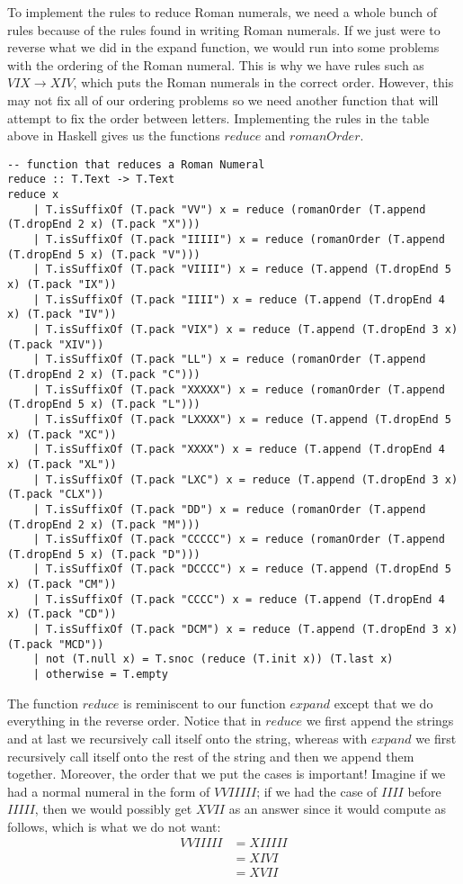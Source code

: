 \documentclass{article}
\begin{document}
To implement the rules to reduce Roman numerals, we need a whole bunch of rules because of the rules found in writing Roman numerals. If we just were to reverse what we did in the expand function, we would run into some problems with the ordering of the Roman numeral. This is why we have rules such as $VIX \rightarrow XIV$, which puts the Roman numerals in the correct order. However, this may not fix all of our ordering problems so we need another function that will attempt to fix the order between letters. Implementing the rules in the table above in Haskell gives us the functions $reduce$ and $romanOrder$. 

\begin{lstlisting}
-- function that reduces a Roman Numeral
reduce :: T.Text -> T.Text
reduce x
    | T.isSuffixOf (T.pack "VV") x = reduce (romanOrder (T.append (T.dropEnd 2 x) (T.pack "X")))
    | T.isSuffixOf (T.pack "IIIII") x = reduce (romanOrder (T.append (T.dropEnd 5 x) (T.pack "V")))
    | T.isSuffixOf (T.pack "VIIII") x = reduce (T.append (T.dropEnd 5 x) (T.pack "IX"))
    | T.isSuffixOf (T.pack "IIII") x = reduce (T.append (T.dropEnd 4 x) (T.pack "IV"))
    | T.isSuffixOf (T.pack "VIX") x = reduce (T.append (T.dropEnd 3 x) (T.pack "XIV"))
    | T.isSuffixOf (T.pack "LL") x = reduce (romanOrder (T.append (T.dropEnd 2 x) (T.pack "C")))
    | T.isSuffixOf (T.pack "XXXXX") x = reduce (romanOrder (T.append (T.dropEnd 5 x) (T.pack "L")))
    | T.isSuffixOf (T.pack "LXXXX") x = reduce (T.append (T.dropEnd 5 x) (T.pack "XC"))
    | T.isSuffixOf (T.pack "XXXX") x = reduce (T.append (T.dropEnd 4 x) (T.pack "XL"))
    | T.isSuffixOf (T.pack "LXC") x = reduce (T.append (T.dropEnd 3 x) (T.pack "CLX"))
    | T.isSuffixOf (T.pack "DD") x = reduce (romanOrder (T.append (T.dropEnd 2 x) (T.pack "M")))
    | T.isSuffixOf (T.pack "CCCCC") x = reduce (romanOrder (T.append (T.dropEnd 5 x) (T.pack "D")))
    | T.isSuffixOf (T.pack "DCCCC") x = reduce (T.append (T.dropEnd 5 x) (T.pack "CM"))
    | T.isSuffixOf (T.pack "CCCC") x = reduce (T.append (T.dropEnd 4 x) (T.pack "CD"))
    | T.isSuffixOf (T.pack "DCM") x = reduce (T.append (T.dropEnd 3 x) (T.pack "MCD"))
    | not (T.null x) = T.snoc (reduce (T.init x)) (T.last x)
    | otherwise = T.empty
\end{lstlisting}

The function $reduce$ is reminiscent to our function $expand$ except that we do everything in the reverse order. Notice that in $reduce$ we first append the strings and at last we recursively call itself onto the string, whereas with $expand$ we first recursively call itself onto the rest of the string and then we append them together. Moreover, the order that we put the cases is important! Imagine if we had a normal numeral in the form of $VVIIIII$; if we had the case of $IIII$ before $IIIII$, then we would possibly get $XVII$ as an answer since it would compute as follows, which is what we do not want:
\begin{align*}
    VVIIIII &= XIIIII \\
    &= XIVI \\
    &= XVII \\
\end{align*}
\end{document}
